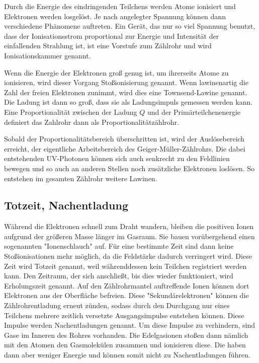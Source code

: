 Durch die Energie des eindringenden Teilchens werden Atome ionisiert und Elektronen werden losgelöst. Je nach angelegter Spannung können dann verschiedene Phänomene auftreten. Ein Gerät, das nur so viel Spannung benutzt, dass der Ionisationsstrom proportional zur Energie und Intensität der einfallenden Strahlung ist, ist eine Vorstufe zum Zählrohr und wird Ionisationskammer genannt. 

Wenn die Energie der Elektronen groß genug ist, um ihrerseits Atome zu ionisieren, wird dieser Vorgang Stoßionisierung genannt. Wenn lawinenartig die Zahl der freien Elektronen zunimmt, wird dies eine Townsend-Lawine genannt. 
Die Ladung ist dann so groß, dass sie als Ladungsimpuls gemessen werden kann.
Eine Proportionalität zwischen der Ladung $Q$ und der Primärteilchenenergie definiert das Zahlrohr dann als Proportionalitätzählrohr. 

Sobald der Proportionalitätsbereich überschritten ist, wird der Auslösebereich erreicht, der eigentliche Arbeitsbereich des Geiger-Müller-Zählrohrs. Die dabei entstehenden UV-Photonen können sich auch senkrecht zu den Feldlinien bewegen und so auch an anderen Stellen noch zusätzliche Elektronen loslösen. So entstehen im gesamten Zählrohr weitere Lawinen. 

\subsection{Totzeit, Nachentladung}
Während die Elektronen schnell zum Draht wandern, bleiben die positiven Ionen aufgrund der größeren Masse länger im Gasraum. Sie bauen vorübergehend einen sogenannten "Ionenschlauch" auf. Für eine bestimmte Zeit sind dann keine Stoßionisationen mehr möglich, da die Feldstärke dadurch verringert wird. Diese Zeit wird Totzeit genannt, weil währenddessen kein Teilchen registriert werden kann. 
Den Zeitraum, der sich anschließt, bis dies wieder funktioniert, wird Erholungszeit genannt. 
Auf den Zählrohrmantel auftreffende Ionen können dort Elektronen aus der Oberfläche befreien. Diese "Sekundärelektronen" können die Zählrohrentladung erneut zünden, sodass durch den Durchgang nur eines Teilchens mehrere zeitlich versetzte Ausgangsimpulse entstehen können. 
Diese Impulse werden Nachentladungen genannt. 
Um diese Impulse zu verhindern, sind Gase im Inneren des Rohres vorhanden. Die Edelgasionen stoßen dann nämlich mit den Atomen den Gasmolekülen zusammen und ionisieren diese. Die haben dann aber weniger Energie und können somit nicht zu Nachentladungen führen. 


